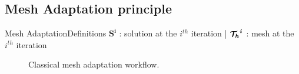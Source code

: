 \subsection{Mesh Adaptation principle}

\begin{frame}{Mesh Adaptation}{Definitions}
  $\boldsymbol{S^i}$ : solution at the $i^{th}$ iteration |
  $\boldsymbol{{\mathcal{T}_h}^i}$ : mesh at the $i^{th}$ iteration
  \vspace{0.5cm}
   \begin{figure}
        \caption*{Classical mesh adaptation workflow.}
   \end{figure}
\end{frame}


